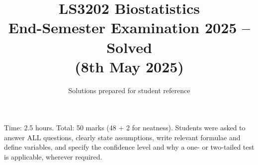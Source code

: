 \documentclass[11pt]{article}
\title{\textbf{LS3202 Biostatistics \\ End-Semester Examination 2025 -- Solved} \\ \large (8th May 2025)}
\author{Solutions prepared for student reference}
\date{}
\begin{document}
\maketitle

\begin{tcolorbox}[colback=notecolor!8, colframe=notecolor, title=Note on this paper]
Time: 2.5 hours. Total: 50 marks (48 + 2 for neatness). Students were asked to answer ALL questions, clearly state assumptions, write relevant formulae and define variables, and specify the confidence level and why a one- or two-tailed test is applicable, wherever required.
\end{tcolorbox}

\tableofcontents
\vspace{1em}

\end{document}
